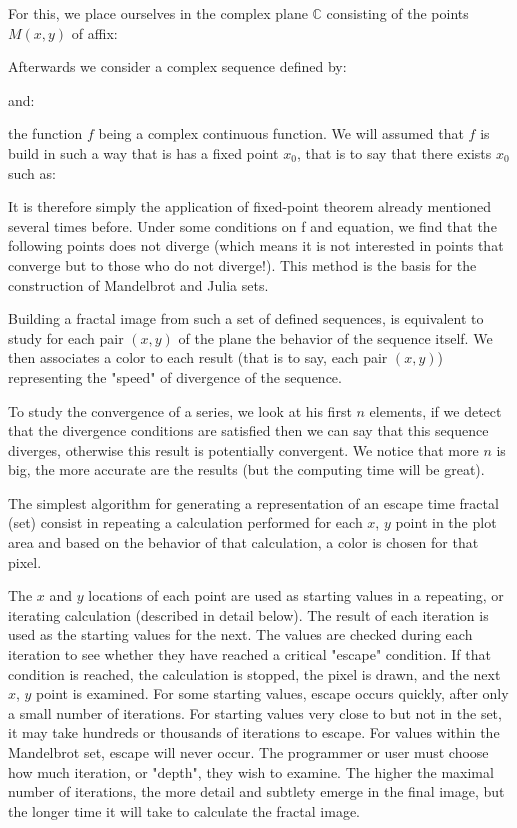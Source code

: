 	For this, we place ourselves in the complex plane $\mathbb{C}$ consisting of the points $M (x, y)$ of affix:
	
	Afterwards we consider a complex sequence defined by:
	
	and:
	
	the function $f$ being a complex continuous function. We will assumed that $f$ is build in such a way that is has a fixed point $x_0$, that is to say that there exists $x_0$ such as:
	
	It is therefore simply the application of fixed-point theorem already mentioned several times before. Under some conditions on f and equation, we find that the following points does not diverge (which means it is not interested in points that converge but to those who do not diverge!). This method is the basis for the construction of Mandelbrot and Julia sets.
	
	Building a fractal image from such a set of defined sequences, is equivalent to study for each pair $(x, y)$ of the plane the behavior of the sequence itself. We then associates a color to each result (that is to say, each pair $(x, y)$) representing the "speed" of divergence of the sequence.
	
	To study the convergence of a series, we look at his first $n$ elements, if we detect that the divergence conditions are satisfied then we can say that this sequence diverges, otherwise this result is potentially convergent. We notice that more $n$ is big, the more accurate are the results (but the computing time will be great).
	
	The simplest algorithm for generating a representation of an escape time fractal (set) consist in repeating a calculation performed for each $x$, $y$ point in the plot area and based on the behavior of that calculation, a color is chosen for that pixel.

	The $x$ and $y$ locations of each point are used as starting values in a repeating, or iterating calculation (described in detail below). The result of each iteration is used as the starting values for the next. The values are checked during each iteration to see whether they have reached a critical "escape" condition. If that condition is reached, the calculation is stopped, the pixel is drawn, and the next $x$, $y$ point is examined. For some starting values, escape occurs quickly, after only a small number of iterations. For starting values very close to but not in the set, it may take hundreds or thousands of iterations to escape. For values within the Mandelbrot set, escape will never occur. The programmer or user must choose how much iteration, or "depth", they wish to examine. The higher the maximal number of iterations, the more detail and subtlety emerge in the final image, but the longer time it will take to calculate the fractal image.

